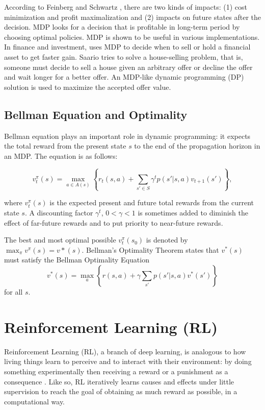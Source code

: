 According to Feinberg and Schwartz \cite{BK01}, there are two kinds of impacts: (1) cost minimization and profit maximalization and (2) impacts on future states after the decision. MDP looks for a decision that is profitable in long-term period by choosing optimal policies. MDP is shown to be useful in various implementations. In finance and investment, \cite{BK03} uses MDP to decide when to sell or hold a financial asset to get faster gain. Saario \cite{BK04} tries to solve a house-selling problem, that is, someone must decide to sell a house given an arbitrary offer or decline the offer and wait longer for a better offer. An MDP-like dynamic programming (DP) solution is used to maximize the accepted offer value.

\subsection{Bellman Equation and Optimality}
Bellman equation plays an important role in dynamic programming: it expects the total reward from the present state $s$ to the end of the propagation horizon in an MDP. The equation \cite{ML01} is as follows:

\[
v^{\pi}_t(s) = \max_{{a\in{}A(s)}}\left\{r_t(s,a)+\sum_{s'\in{}S}\gamma^t p(s'|s,a)v_{t+1}(s')\right\},
\]

where $v^{\pi}_t(s)$ is the expected present and future total rewards from the current state $s$. A discounting factor $\gamma^t$, $0 < \gamma < 1$ is sometimes added to diminish the effect of far-future rewards and to put priority to near-future rewards.

The best and most optimal possible $v^{\pi}_t(s_0)$ is denoted by $\max_{\pi}v^{\pi}(s) = v*(s)$. Bellman's Optimality Theorem states that \cite{BK05} $v^*(s)$ must satisfy the Bellman Optimality Equation
\[
	v^*(s)=\max_{a}\left\{r(s,a)+\gamma{}\sum_{s'}p(s'|s,a)v^*(s')\right\}
\] for all $s$.

\section{Reinforcement Learning (RL)}
\indent\indent Reinforcement Learning (RL), a branch of deep learning, is analogous to how living things learn to perceive and to interact with their environment: by doing something experimentally then receiving a reward or a punishment as a consequence \cite{RL01}. Like so, RL iteratively learns causes and effects under little supervision to reach the goal of obtaining as much reward as possible, in a computational way.

